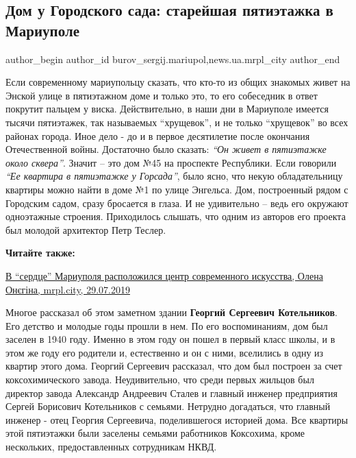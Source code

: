  
 
 
 
 
 
\subsection{Дом у Городского сада: старейшая пятиэтажка в Мариуполе}
\label{sec:03_08_2019.stz.news.ua.mrpl_city.1.dom_u_gorodskogo_sada}
 
\ifcmt
 author_begin
   author_id burov_sergij.mariupol,news.ua.mrpl_city
 author_end
\fi


Если современному мариупольцу сказать, что кто-то из общих знакомых живет на
Энской улице в пятиэтажном доме и только это, то его собеседник в ответ
покрутит пальцем у виска. Действительно, в наши дни в Мариуполе имеется тысячи
пятиэтажек, так называемых \enquote{хрущевок}, и не только \enquote{хрущевок}
во всех районах города. Иное дело - до и в первое десятилетие после окончания
Отечественной войны. Достаточно было сказать: \emph{\enquote{Он живет в пятиэтажке
около сквера}}. Значит – это дом №45 на проспекте Республики. Если говорили
\emph{\enquote{Ее квартира в пятиэтажке у Горсада}}, было ясно, что некую
обладательницу квартиры можно найти в доме №1 по улице Энгельса. Дом,
построенный рядом с Городским садом, сразу бросается в глаза. И не удивительно
– ведь его окружают одноэтажные строения. Приходилось слышать, что одним из
авторов его проекта был молодой архитектор Петр Теслер.

\textbf{Читайте также:} 

\href{https://mrpl.city/news/view/v-serdtse-mariupolya-raspolozhilsya-tsentr-sovremennogo-iskusstva-foto-1}{%
В \enquote{сердце} Мариуполя расположился центр современного искусства, Олена Онєгіна, mrpl.city, 29.07.2019}

Многое рассказал об этом заметном здании \textbf{Георгий Сергеевич Котельников}. Его
детство и молодые годы прошли в нем. По его воспоминаниям, дом был заселен в
1940 году. Именно в этом году он пошел в первый класс школы, и в этом же году
его родители и, естественно и он с ними, вселились в одну из квартир этого
дома. Георгий Сергеевич рассказал, что дом был построен за счет
коксохимического завода. Неудивительно, что среди первых жильцов был директор
завода Александр Андреевич Сталев и главный инженер предприятия Сергей
Борисович Котельников с семьями. Нетрудно догадаться, что главный инженер -
отец Георгия Сергеевича, поделившегося историей дома. Все квартиры этой
пятиэтажки были заселены семьями работников Коксохима, кроме нескольких,
предоставленных сотрудникам НКВД.

